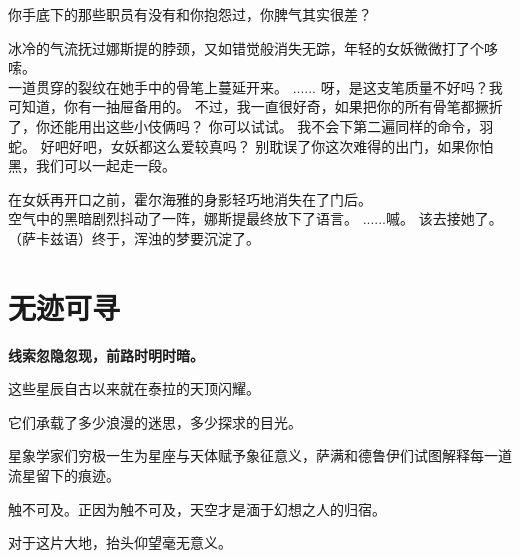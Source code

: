 \documentclass[openany]{book}
\begin{document}
\begin{dialogue}
     你手底下的那些职员有没有和你抱怨过，你脾气其实很差？\par
    冰冷的气流抚过娜斯提的脖颈，又如错觉般消失无踪，年轻的女妖微微打了个哆嗦。\\
    一道贯穿的裂纹在她手中的骨笔上蔓延开来。
     ......
     呀，是这支笔质量不好吗？我可知道，你有一抽屉备用的。
     不过，我一直很好奇，如果把你的所有骨笔都撅折了，你还能用出这些小伎俩吗？
     你可以试试。
     我不会下第二遍同样的命令，羽蛇。
     好吧好吧，女妖都这么爱较真吗？
     别耽误了你这次难得的出门，如果你怕黑，我们可以一起走一段。\par
    在女妖再开口之前，霍尔海雅的身影轻巧地消失在了门后。\\
    空气中的黑暗剧烈抖动了一阵，娜斯提最终放下了语言。
     ......嘁。
     该去接她了。
     （萨卡兹语）终于，浑浊的梦要沉淀了。
\end{dialogue}

\chapter{无迹可寻}
\begin{center} \textbf{线索忽隐忽现，前路时明时暗。}\end{center} \par
\clearpage

这些星辰自古以来就在泰拉的天顶闪耀。\par
它们承载了多少浪漫的迷思，多少探求的目光。\par
星象学家们穷极一生为星座与天体赋予象征意义，萨满和德鲁伊们试图解释每一道流星留下的痕迹。\par
触不可及。正因为触不可及，天空才是湎于幻想之人的归宿。\par
对于这片大地，抬头仰望毫无意义。
\end{document}
